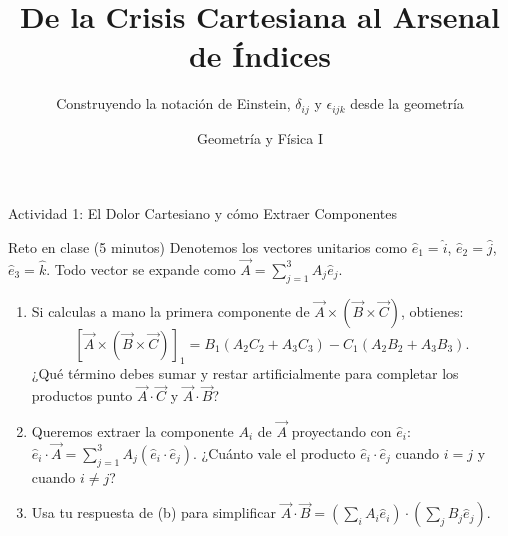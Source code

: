 \documentclass[10pt,aspectratio=169]{beamer}
\title[Semana 1: Construcción del Arsenal Indicial]{De la Crisis Cartesiana al Arsenal de Índices}
\subtitle{Construyendo la notación de Einstein, $\delta_{ij}$ y $\epsilon_{ijk}$ desde la geometría}
\author{Geometría y Física I}
\institute{Licenciatura en Física}
\date{}
\begin{document}
\setlength{\abovedisplayskip}{3pt}
\setlength{\belowdisplayskip}{3pt}

\begin{frame}
  \titlepage
\end{frame}

\begin{frame}{Actividad 1: El Dolor Cartesiano y cómo Extraer Componentes}
  \begin{block}{Reto en clase (5 minutos)}
    \small
    Denotemos los vectores unitarios como $\hat{e}_1 = \hat{i}$, $\hat{e}_2 = \hat{j}$, $\hat{e}_3 = \hat{k}$. Todo vector se expande como $\vec{A} = \sum_{j=1}^3 A_j\hat{e}_j$.
    \begin{enumerate}
      \item[(a)] Si calculas a mano la primera componente de $\vec{A} \times (\vec{B} \times \vec{C})$, obtienes:
      \[
      [\vec{A} \times (\vec{B} \times \vec{C})]_1 = B_1(A_2 C_2 + A_3 C_3) - C_1(A_2 B_2 + A_3 B_3).
      \]
      ¿Qué término debes sumar y restar artificialmente para completar los productos punto $\vec{A}\cdot\vec{C}$ y $\vec{A}\cdot\vec{B}$?
      \item[(b)] Queremos extraer la componente $A_i$ de $\vec{A}$ proyectando con $\hat{e}_i$: $\hat{e}_i \cdot \vec{A} = \sum_{j=1}^3 A_j (\hat{e}_i \cdot \hat{e}_j)$.
      ¿Cuánto vale el producto $\hat{e}_i \cdot \hat{e}_j$ cuando $i = j$ y cuando $i \neq j$?
      \item[(c)] Usa tu respuesta de (b) para simplificar $\vec{A}\cdot\vec{B} = \left(\sum_i A_i\hat{e}_i\right)\cdot\left(\sum_j B_j\hat{e}_j\right)$.
    \end{enumerate}
  \end{block}
\end{frame}
\end{document}
